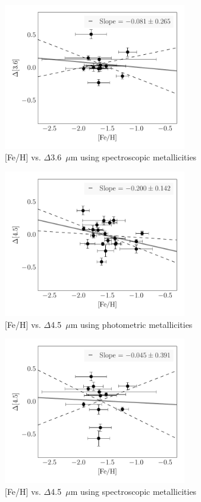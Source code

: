 \documentclass[a4paper,fleqn,usenatbib]{mnras}
\begin{document}
\begin{figure}
\begin{center}
\includegraphics[width=80mm]{final_plots/delta_feh_3p6_spect.pdf}
\caption{[Fe/H] vs. $\Delta$3.6~$\mu$m using spectroscopic metallicities}
\label{fig:delta_3p6_spect}
\end{center}
\end{figure}

\begin{figure}
\begin{center}
\includegraphics[width=80mm]{final_plots/delta_feh_4p5_phot.pdf}
\caption{[Fe/H] vs. $\Delta$4.5~$\mu$m using photometric metallicities}
\label{fig:delta_4p5_phot}
\end{center}
\end{figure}

\begin{figure}
\begin{center}
\includegraphics[width=80mm]{final_plots/delta_feh_4p5_spect.pdf}
\caption{[Fe/H] vs. $\Delta$4.5~$\mu$m using spectroscopic metallicities}
\label{fig:delta_4p5_spect}
\end{center}
\end{figure}
\end{document}
